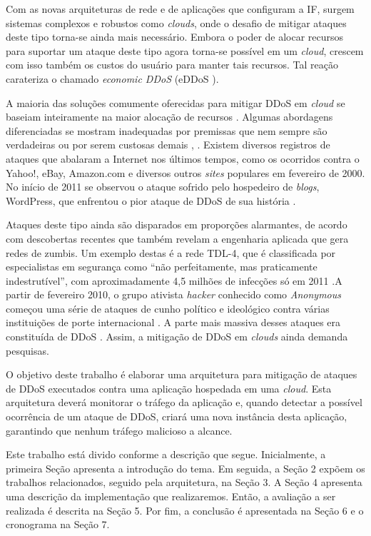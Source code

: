 Com as novas arquiteturas de rede e de aplicações que configuram a IF, surgem sistemas complexos e robustos como \emph{clouds}, onde o desafio de mitigar ataques deste tipo torna-se ainda mais necessário.  Embora o poder de
alocar recursos para suportar um ataque deste tipo  agora torna-se
possível em um \emph{cloud}, crescem com isso também os custos do usuário para manter tais recursos. Tal reação
carateriza o chamado \emph{economic DDoS} (eDDoS \cite{Soon:10}).
  
A maioria das soluções comumente oferecidas para mitigar DDoS em \emph{cloud} se baseiam inteiramente na maior alocação de
recursos \cite{Peng:2007:SND:1216370.1216373}.  %
%
Algumas abordagens diferenciadas se mostram inadequadas por premissas que nem sempre são verdadeiras ou por serem custosas demais \cite{Bakshi:10}, \cite{Liu:2010:NFD:1866835.1866849}.
Existem diversos registros de ataques que abalaram a Internet nos últimos tempos, como os ocorridos contra o Yahoo!, eBay, Amazon.com e diversos outros \emph{sites} populares em fevereiro de 2000.  No início de 2011 se observou o ataque sofrido pelo hospedeiro de \emph{blogs}, WordPress, que enfrentou o pior ataque de DDoS de sua história \cite{infoexame}.

Ataques deste tipo ainda são disparados em proporções alarmantes, de acordo com descobertas recentes que também revelam a engenharia aplicada que gera redes de zumbis. Um exemplo destas é a rede TDL-4, que é classificada por especialistas em segurança como “não perfeitamente, mas praticamente indestrutível”, com aproximadamente 4,5 milhões de infecções só em 2011 \cite{tdl4}.A partir de fevereiro 2010, o grupo ativista \textit{hacker} conhecido como \textit{Anonymous} começou uma série de ataques de cunho político e ideológico contra várias instituições de porte internacional \cite{titstorm}. A parte mais massiva desses ataques era constituída de DDoS \cite{infoexame}.  Assim, a mitigação de DDoS em \emph{clouds} ainda demanda pesquisas.

O objetivo deste trabalho é elaborar uma arquitetura para mitigação de ataques de
DDoS executados contra uma aplicação hospedada em uma \emph{cloud}. Esta
arquitetura deverá monitorar o tráfego da aplicação e, quando
detectar a possível ocorrência de um ataque de DDoS, criará uma nova
instância desta aplicação, garantindo que nenhum tráfego malicioso a alcance. 


Este trabalho está divido conforme a descrição que segue. Inicialmente,  
a primeira Seção apresenta a introdução do tema. Em seguida, a Seção 2 expõem os trabalhos relacionados, seguido pela arquitetura, na Seção 3. A Seção 4 apresenta uma descrição da implementação que realizaremos. Então, a avaliação a ser realizada é descrita na Seção 5. Por fim, a conclusão é apresentada na Seção 6 e o cronograma na Seção 7.

